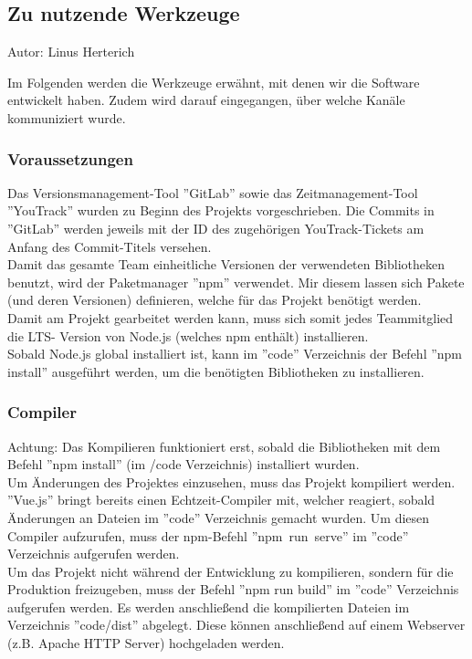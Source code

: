 \documentclass[twoside]{report}
\begin{document}
\subsection{Zu nutzende Werkzeuge}
{\small Autor: Linus Herterich}

Im Folgenden werden die Werkzeuge erwähnt, mit denen wir die Software
entwickelt haben. Zudem wird darauf eingegangen, über welche Kanäle kommuniziert
wurde.


\subsubsection{Voraussetzungen}
Das Versionsmanagement-Tool ''GitLab'' sowie das Zeitmanagement-Tool ''YouTrack''
wurden zu Beginn des Projekts vorgeschrieben. Die Commits in ''GitLab'' werden jeweils mit
der ID des zugehörigen YouTrack-Tickets am Anfang des Commit-Titels versehen.
\\Damit das gesamte Team einheitliche Versionen der verwendeten Bibliotheken benutzt,
wird der Paketmanager ''npm'' verwendet. Mir diesem lassen sich Pakete (und deren Versionen) definieren,
welche für das Projekt benötigt werden.
\\ Damit am Projekt gearbeitet werden kann, muss sich somit jedes Teammitglied die LTS-
Version von Node.js (welches npm enthält) installieren.
\\ Sobald Node.js global installiert ist, kann im ''code'' Verzeichnis der Befehl
''npm install'' ausgeführt werden, um die benötigten Bibliotheken zu installieren.

\subsubsection{Compiler}
Achtung: Das Kompilieren funktioniert erst, sobald die Bibliotheken mit dem Befehl
''npm install'' (im /code Verzeichnis) installiert wurden.
\\
Um Änderungen des Projektes einzusehen, muss das Projekt kompiliert werden.
''Vue.js'' bringt bereits einen Echtzeit-Compiler mit, welcher reagiert, sobald Änderungen
an Dateien im ''code'' Verzeichnis gemacht wurden. Um diesen Compiler aufzurufen, muss der npm-Befehl \mbox{''npm run serve''} im ''code'' Verzeichnis
aufgerufen werden.
\\Um das Projekt nicht während der Entwicklung zu kompilieren, sondern für die Produktion freizugeben,
muss der Befehl ''npm run build'' im ''code'' Verzeichnis aufgerufen werden. Es werden
anschließend die kompilierten Dateien im Verzeichnis ''code/dist'' abgelegt.
Diese können anschließend auf einem Webserver (z.B. Apache HTTP Server) hochgeladen werden.
\end{document}
